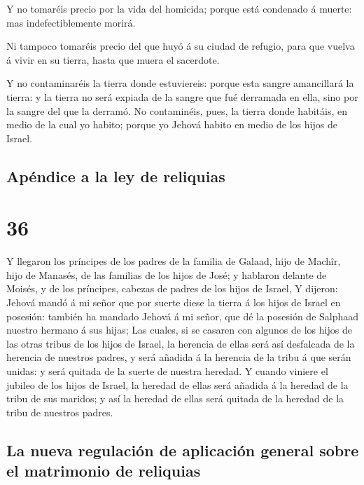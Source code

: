  Y no tomaréis precio por la vida del homicida; porque
está condenado á muerte: mas indefectiblemente morirá.

 Ni tampoco tomaréis precio del que huyó á su ciudad de
refugio, para que vuelva á vivir en su tierra, hasta que muera el
sacerdote.

 Y no contaminaréis la tierra donde estuviereis: porque
esta sangre amancillará la tierra: y la tierra no será expiada de la
sangre que fué derramada en ella, sino por la sangre del que la derramó.
 No contaminéis, pues, la tierra donde habitáis, en medio
de la cual yo habito; porque yo Jehová habito en medio de los hijos de
Israel.

\hypertarget{apuxe9ndice-a-la-ley-de-reliquias}{%
\subsection{Apéndice a la ley de
reliquias}\label{apuxe9ndice-a-la-ley-de-reliquias}}

\hypertarget{section-04-36}{%
\section{36}\label{section-04-36}}

 Y llegaron los príncipes de los padres de la familia de
Galaad, hijo de Machîr, hijo de Manasés, de las familias de los hijos de
José; y hablaron delante de Moisés, y de los príncipes, cabezas de
padres de los hijos de Israel,  Y dijeron: Jehová mandó á
mi señor que por suerte diese la tierra á los hijos de Israel en
posesión: también ha mandado Jehová á mi señor, que dé la posesión de
Salphaad nuestro hermano á sus hijas;  Las cuales, si se
casaren con algunos de los hijos de las otras tribus de los hijos de
Israel, la herencia de ellas será así desfalcada de la herencia de
nuestros padres, y será añadida á la herencia de la tribu á que serán
unidas: y será quitada de la suerte de nuestra heredad.  Y
cuando viniere el jubileo de los hijos de Israel, la heredad de ellas
será añadida á la heredad de la tribu de sus maridos; y así la heredad
de ellas será quitada de la heredad de la tribu de nuestros padres.

\hypertarget{la-nueva-regulaciuxf3n-de-aplicaciuxf3n-general-sobre-el-matrimonio-de-reliquias}{%
\subsection{La nueva regulación de aplicación general sobre el
matrimonio de
reliquias}\label{la-nueva-regulaciuxf3n-de-aplicaciuxf3n-general-sobre-el-matrimonio-de-reliquias}}

